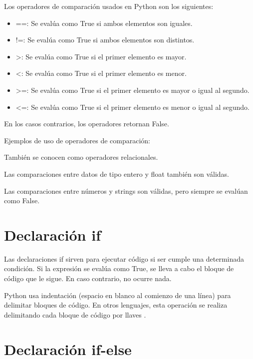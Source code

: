 \documentclass{report}
\begin{document}
{Los operadores de comparación usados en Python son los siguientes:

\begin{itemize}
  \item ==: Se evalúa como True si ambos elementos son iguales.
  \item !=: Se evalúa como True si ambos elementos son distintos.
  \item >: Se evalúa como True si el primer elemento es mayor.
  \item <: Se evalúa como True si el primer elemento es menor.
  \item >=: Se evalúa como True si el primer elemento es mayor o igual al segundo.
  \item <=: Se evalúa como True si el primer elemento es menor o igual al segundo.
\end{itemize}

En los casos contrarios, los operadores retornan False.

Ejemplos de uso de operadores de comparación:


También se conocen como operadores relacionales.

Las comparaciones entre datos de tipo entero y float también son válidas.


Las comparaciones entre números y strings son válidas, pero siempre se evalúan como False.


\section{Declaración if}

Las declaraciones if sirven para ejecutar código si ser cumple una determinada condición. Si la expresión se evalúa como True, se lleva a cabo el bloque de código que le sigue. En caso contrario, no ocurre nada.


Python usa indentación (espacio en blanco al comienzo de una línea) para delimitar bloques de código. En otros lenguajes, esta operación se realiza delimitando cada bloque de código por llaves {}.

\section{Declaración if-else}

}
\end{document}
